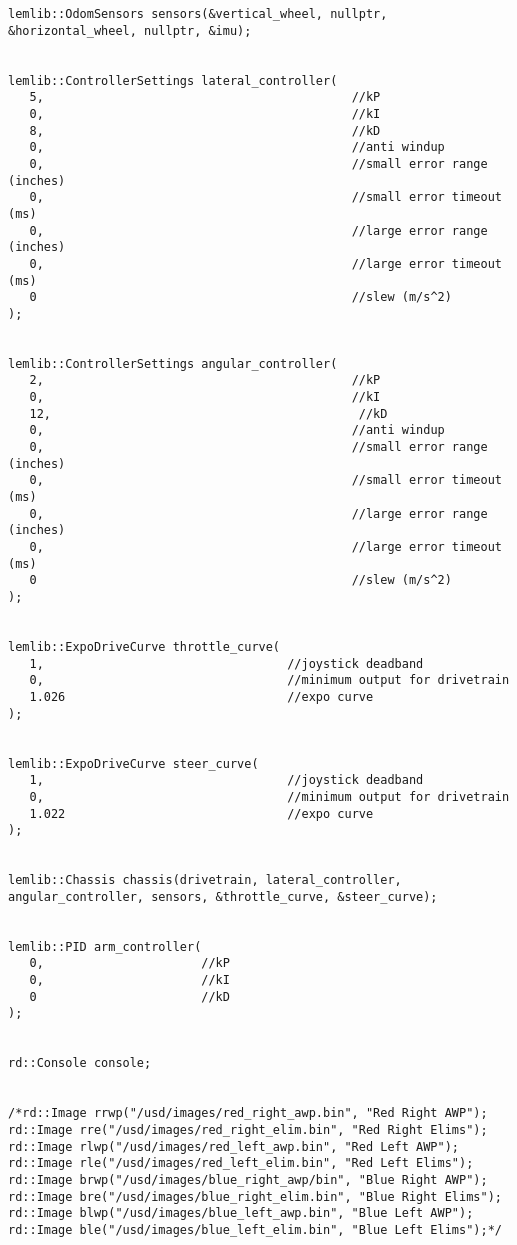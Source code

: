 \begin{verbatim}
lemlib::OdomSensors sensors(&vertical_wheel, nullptr, &horizontal_wheel, nullptr, &imu);


lemlib::ControllerSettings lateral_controller(
   5,                                           //kP
   0,                                           //kI
   8,                                           //kD
   0,                                           //anti windup
   0,                                           //small error range (inches)
   0,                                           //small error timeout (ms)
   0,                                           //large error range (inches)
   0,                                           //large error timeout (ms)
   0                                            //slew (m/s^2)
);


lemlib::ControllerSettings angular_controller(
   2,                                           //kP
   0,                                           //kI
   12,                                           //kD
   0,                                           //anti windup
   0,                                           //small error range (inches)
   0,                                           //small error timeout (ms)
   0,                                           //large error range (inches)
   0,                                           //large error timeout (ms)
   0                                            //slew (m/s^2)
);


lemlib::ExpoDriveCurve throttle_curve(
   1,                                  //joystick deadband
   0,                                  //minimum output for drivetrain
   1.026                               //expo curve
);


lemlib::ExpoDriveCurve steer_curve(
   1,                                  //joystick deadband
   0,                                  //minimum output for drivetrain
   1.022                               //expo curve
);


lemlib::Chassis chassis(drivetrain, lateral_controller, angular_controller, sensors, &throttle_curve, &steer_curve);


lemlib::PID arm_controller(
   0,                      //kP
   0,                      //kI
   0                       //kD
);


rd::Console console;


/*rd::Image rrwp("/usd/images/red_right_awp.bin", "Red Right AWP");
rd::Image rre("/usd/images/red_right_elim.bin", "Red Right Elims");
rd::Image rlwp("/usd/images/red_left_awp.bin", "Red Left AWP");
rd::Image rle("/usd/images/red_left_elim.bin", "Red Left Elims");
rd::Image brwp("/usd/images/blue_right_awp/bin", "Blue Right AWP");
rd::Image bre("/usd/images/blue_right_elim.bin", "Blue Right Elims");
rd::Image blwp("/usd/images/blue_left_awp.bin", "Blue Left AWP");
rd::Image ble("/usd/images/blue_left_elim.bin", "Blue Left Elims");*/



\end{verbatim}
